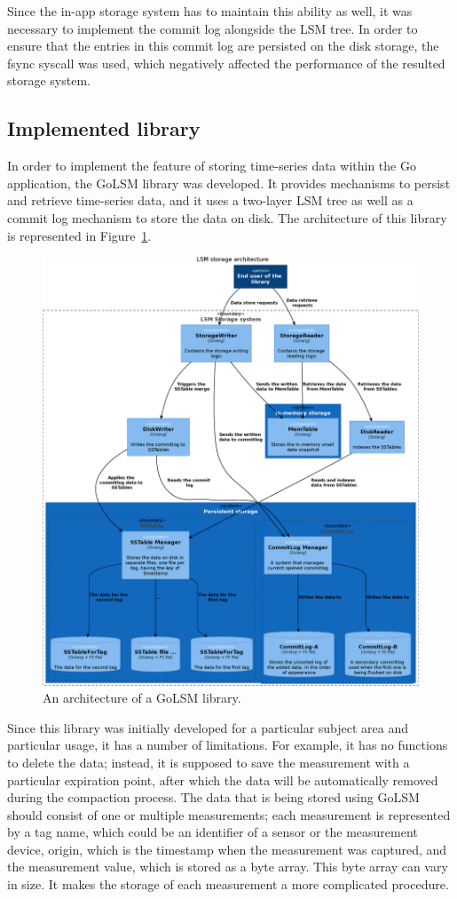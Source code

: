 Since the in-app storage system has to maintain this ability as well, it was necessary to implement the commit log alongside the LSM tree. In order to ensure that the entries in this commit log are persisted on the disk storage, the fsync syscall was used, which negatively affected the performance of the resulted storage system.

\subsection{Implemented library}
In order to implement the feature of storing time-series data within the Go application, the GoLSM library was developed. It provides mechanisms to persist and retrieve time-series data, and it uses a two-layer LSM tree as well as a commit log mechanism to store the data on disk. The architecture of this library is represented in Figure~\ref{fig2}.
\begin{figure}[h!]
\includegraphics[width=\textwidth,keepaspectratio]{figures/golsm-arch.eps}
\caption{An architecture of a GoLSM library.} \label{fig2}
\end{figure}

 Since this library was initially developed for a particular subject area and particular usage, it has a number of limitations. For example, it has no functions to delete the data; instead, it is supposed to save the measurement with a particular expiration point, after which the data will be automatically removed during the compaction process. The data that is being stored using GoLSM should consist of one or multiple measurements; each measurement is represented by a tag name, which could be an identifier of a sensor or the measurement device, origin, which is the timestamp when the measurement was captured, and the measurement value, which is stored as a byte array. This byte array can vary in size. It makes the storage of each measurement a more complicated procedure.


